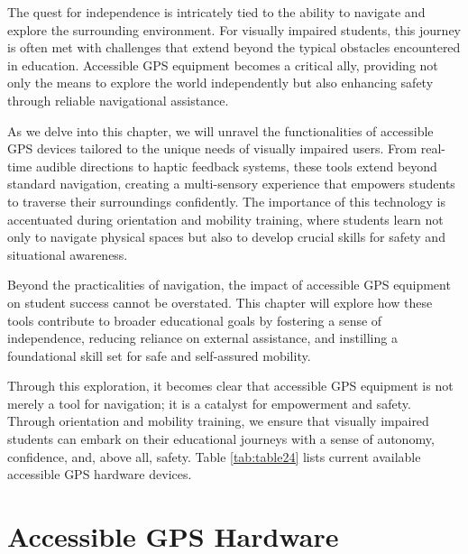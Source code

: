 \documentclass[12pt,letterpaper,twoside]{extreport}
\begin{document}
The quest for independence is intricately tied to the ability to navigate and explore the surrounding environment. For visually impaired students, this journey is often met with challenges that extend beyond the typical obstacles encountered in education. Accessible GPS equipment becomes a critical ally, providing not only the means to explore the world independently but also enhancing safety through reliable navigational assistance.

As we delve into this chapter, we will unravel the functionalities of accessible GPS devices tailored to the unique needs of visually impaired users. From real-time audible directions to haptic feedback systems, these tools extend beyond standard navigation, creating a multi-sensory experience that empowers students to traverse their surroundings confidently. The importance of this technology is accentuated during orientation and mobility training, where students learn not only to navigate physical spaces but also to develop crucial skills for safety and situational awareness.

Beyond the practicalities of navigation, the impact of accessible GPS equipment on student success cannot be overstated. This chapter will explore how these tools contribute to broader educational goals by fostering a sense of independence, reducing reliance on external assistance, and instilling a foundational skill set for safe and self-assured mobility.

Through this exploration, it becomes clear that accessible GPS equipment is not merely a tool for navigation; it is a catalyst for empowerment and safety. Through orientation and mobility training, we ensure that visually impaired students can embark on their educational journeys with a sense of autonomy, confidence, and, above all, safety.
Table \ref{tab:table24} lists current available accessible GPS hardware devices.

\hypertarget{accessible-gps-mapping-hardware}{}\section{Accessible GPS Hardware}\label{accessible-gps-mapping-hardware}
\end{document}
